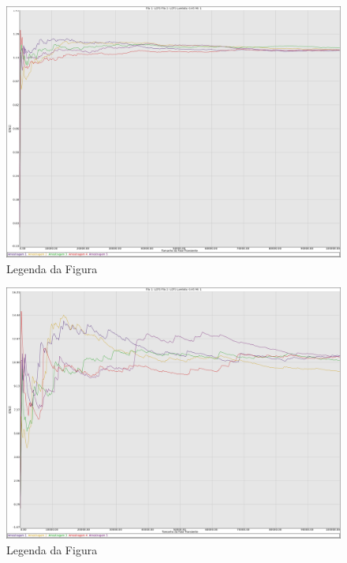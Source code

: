 \documentclass[a4paper,10pt]{article}
\begin{document}
\begin{figure}
	\caption{Legenda da Figura}
	\label{figTransienteLCFSfila1N}
	\includegraphics[scale = 0.2]{./graficos_transiente_1/LCFS/01.png}
\end{figure}

\begin{figure}
	\caption{Legenda da Figura}
	\label{figTransienteLCFSfila2N}
	\includegraphics[scale = 0.2]{./graficos_transiente_1/LCFS/02.png}
\end{figure}
\end{document}
